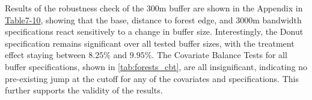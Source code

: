 Results of the robustness check of the 300m buffer are shown in the Appendix in \hyperref[tab:forests_base]{Table7-10}, showing that the base, distance to forest edge, and 3000m bandwidth specifications react sensitively to a change in buffer size.
Interestingly, the Donut specification remains significant over all tested buffer sizes, with the treatment effect staying between $8.25\%$ and $9.95\%$.
The Covariate Balance Tests for all buffer specifications, shown in \cref{tab:forests_cbt}, are all insignificant, indicating no pre-existing jump at the cutoff for any of the covariates and specifications.
This further supports the validity of the results.